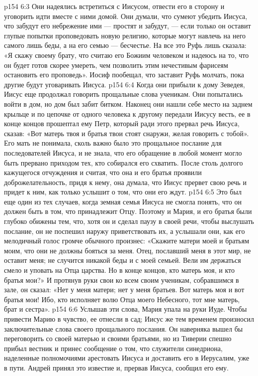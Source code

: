 \vs p154 6:3 Они надеялись встретиться с Иисусом, отвести его в сторону и уговорить идти вместе с ними домой. Они думали, что сумеют убедить Иисуса, что забудут его небрежение ими --- простят и забудут, --- если только он оставит глупые попытки проповедовать новую религию, которые могут навлечь на него самого лишь беды, а на его семью --- бесчестье. На все это Руфь лишь сказала: «Я скажу своему брату, что считаю его Божиим человеком и надеюсь на то, что он будет готов скорее умереть, чем позволить этим нечестивым фарисеям остановить его проповедь». Иосиф пообещал, что заставит Руфь молчать, пока другие будут уговаривать Иисуса.
\vs p154 6:4 Когда они прибыли к дому Зеведея, Иисус еще продолжал говорить прощальные слова ученикам. Они попытались войти в дом, но дом был забит битком. Наконец они нашли себе место на заднем крыльце и по цепочке от одного человека к другому передали Иисусу весть, ее в конце концов прошептал ему Петр, который ради этого прервал речь Иисуса, сказав: «Вот матерь твоя и братья твои стоят снаружи, желая говорить с тобой». Его мать не понимала, сколь важно было это прощальное послание для последователей Иисуса, и не знала, что его обращение в любой момент могло быть прервано приходом тех, кто собирался его схватить. После столь долгого кажущегося отчуждения и считая, что она и его братья проявили доброжелательность, придя к нему, она думала, что Иисус прервет свою речь и придет к ним, как только услышит о том, что они его ждут.
\vs p154 6:5 Это был еще один из тех случаев, когда земная семья Иисуса не смогла понять, что он должен быть в том, что принадлежит Отцу. Поэтому и Мария, и его братья были глубоко обижены тем, что, хотя он и сделал паузу в своей речи, чтобы выслушать послание, он не поспешил наружу приветствовать их, а услышали они, как его мелодичный голос громче обычного произнес: «Скажите матери моей и братьям моим, что они не должны бояться за меня. Отец, пославший меня в этот мир, не оставит меня; не случится никакой беды и с моей семьей. Вели им держаться смело и уповать на Отца царства. Но в конце концов, кто матерь моя, и кто братья мои?» И протянув руки свои ко всем своим ученикам, собравшимся в зале, он сказал: «Нет у меня матери; нет у меня братьев. Вот матерь моя и вот братья мои! Ибо, кто исполняет волю Отца моего Небесного, тот мне матерь, брат и сестра».
\vs p154 6:6 Услышав эти слова, Мария упала на руки Иуде. Чтобы привести Марию в чувство, ее отнесли в сад; Иисус же тем временем произносил заключительные слова своего прощального послания. Он наверняка вышел бы переговорить со своей матерью и своими братьями, но из Тиверии спешно прибыл вестник и принес сообщение о том, что служители синедриона, наделенные полномочиями арестовать Иисуса и доставить его в Иерусалим, уже в пути. Андрей принял это известие и, прервав Иисуса, сообщил его ему.
